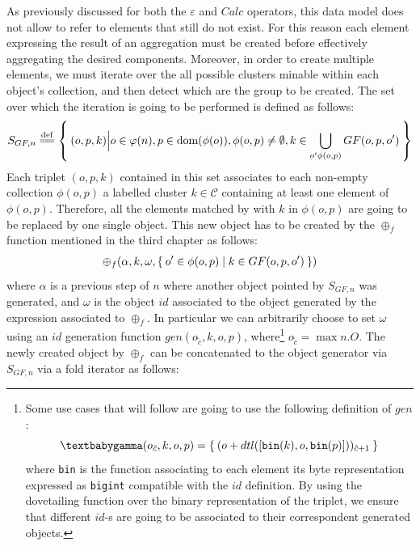 As previously discussed for both the $\varepsilon$ and $Calc$ operators, this data model does not allow to refer to elements that still do not exist. For this reason each element expressing the result of an aggregation must be created before effectively aggregating the desired components. Moreover, in order to create multiple elements, we must  iterate over the all possible clusters minable within each object's collection, and then detect which are the group to be created. The set over which the iteration is going to be performed is defined as follows:
\[S_{GF,n}\overset{\mathrm{def}}{=\mathrel{\mkern-3mu}=}\Set{(o,p,k)\Big|o\in \varphi(n),p\in\operatorname{dom}(\phi(o)),\phi(o,p)\neq\emptyset, k\in\bigcup_{o'\phi(o,p)} GF(o,p,o')}\]
Each triplet $(o,p,k)$ contained in this set associates to each non-empty collection $\phi(o,p)$ a labelled cluster $k\in\mathcal{C}$ containing at least one element of $\phi(o,p)$. Therefore, all the elements matched by with $k$ in $\phi(o,p)$ are going to be replaced by one single object. This new object has to be created by the $\oplus_f$ function mentioned in the third chapter as follows: 
\[\oplus_f(\alpha,k,\omega,\Set{o'\in\phi(o,p)|k\in GF(o,p,o')})\]
where $\alpha$ is a previous step of $n$ where another object pointed by $S_{GF,n}$ was generated, and $\omega$ is the object $id$ associated to the object generated by the expression associated to $\oplus_f$. In particular we can arbitrarily choose to set $\omega$ using an $id$ generation function $gen(o_{\tilde{c}},k,o,p)$, where\footnote{Some use cases that will follow are going to use the following definition of $gen$: \[\genp(o_{\tilde{c}},k,o,p)=\Set{(o+dtl([\texttt{bin}(k),o,\texttt{bin}(p)]))_{\tilde{c}+1}}\] where \texttt{bin} is the function associating to each element its byte representation expressed as \texttt{bigint} compatible with the $id$ definition. By using the dovetailing function over the binary representation of the triplet, we ensure that different $id$-s are going to be associated to their correspondent generated objects.} $o_{\tilde{c}} = \max n.O$. The newly created object by $\oplus_f$  can be concatenated to the object generator via $S_{GF,n}$ via a fold iterator as follows:
